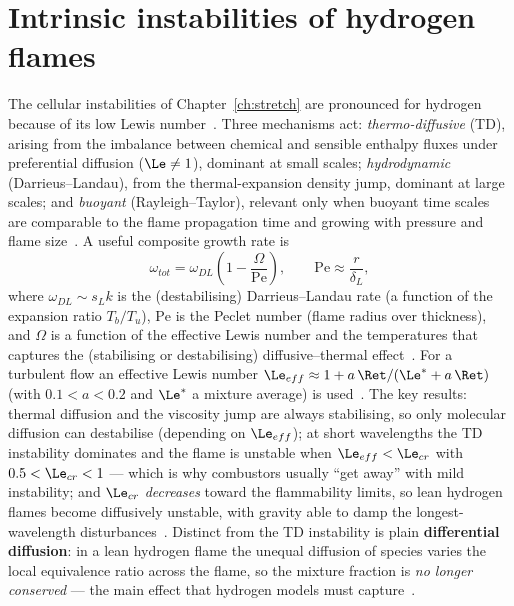 \section{Intrinsic instabilities of hydrogen flames}

The cellular instabilities of Chapter~\ref{ch:stretch} are pronounced for hydrogen because of its low Lewis number~\cite{lecture14,oppong2022instability}. Three mechanisms act: \emph{thermo-diffusive} (TD), arising from the imbalance between chemical and sensible enthalpy fluxes under preferential diffusion ($\Le\ne1$), dominant at small scales; \emph{hydrodynamic} (Darrieus--Landau), from the thermal-expansion density jump, dominant at large scales; and \emph{buoyant} (Rayleigh--Taylor), relevant only when buoyant time scales are comparable to the flame propagation time and growing with pressure and flame size~\cite{lecture14}. A useful composite growth rate is
\begin{equation}
\omega_{tot}=\omega_{DL}\left(1-\frac{\Omega}{\mathrm{Pe}}\right),\qquad \mathrm{Pe}\approx\frac{r}{\delta_L},
\label{eq:cellular-growth}
\end{equation}
where $\omega_{DL}\sim s_L k$ is the (destabilising) Darrieus--Landau rate (a function of the expansion ratio $T_b/T_u$), $\mathrm{Pe}$ is the Peclet number (flame radius over thickness), and $\Omega$ is a function of the effective Lewis number and the temperatures that captures the (stabilising or destabilising) diffusive--thermal effect~\cite{lecture14}. For a turbulent flow an effective Lewis number $\Le_{eff}\approx1+a\,\Ret/(\Le^*+a\,\Ret)$ (with $0.1<a<0.2$ and $\Le^*$ a mixture average) is used~\cite{lecture14}. The key results: thermal diffusion and the viscosity jump are always stabilising, so only molecular diffusion can destabilise (depending on $\Le_{eff}$); at short wavelengths the TD instability dominates and the flame is unstable when $\Le_{eff}<\Le_{cr}$ with $0.5<\Le_{cr}<1$ --- which is why combustors usually ``get away'' with mild instability; and $\Le_{cr}$ \emph{decreases} toward the flammability limits, so lean hydrogen flames become diffusively unstable, with gravity able to damp the longest-wavelength disturbances~\cite{lecture14}. Distinct from the TD instability is plain \textbf{differential diffusion}: in a lean hydrogen flame the unequal diffusion of species varies the local equivalence ratio across the flame, so the mixture fraction is \emph{no longer conserved} --- the main effect that hydrogen models must capture~\cite{lecture14}.

